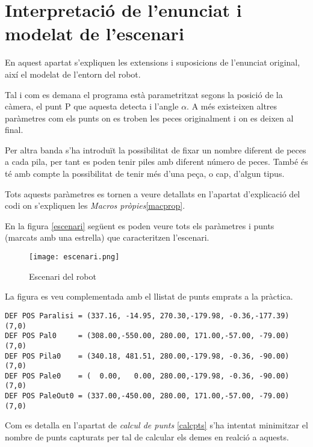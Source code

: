 \section{Interpretació de l'enunciat i modelat de l'escenari}
En aquest apartat s'expliquen les extensions i suposicions de l'enunciat original,
així el modelat de l'entorn del robot.

Tal i com es demana el programa està parametritzat segons la posició de la càmera,
el punt P que aquesta detecta i l'angle $\alpha$. A més existeixen altres paràmetres
com els punts on es troben les peces originalment i on es deixen al final.

Per altra banda s'ha introduït la possibilitat de fixar un nombre diferent de peces
a cada pila, per tant es poden tenir piles amb diferent número de peces. També
és té amb compte la possibilitat de tenir més d'una peça, o cap, d'algun tipus.

Tots aquests paràmetres es tornen a veure detallats en l'apartat d'explicació del
codi on s'expliquen les \emph{Macros pròpies}\ref{macprop}.

En la figura \ref{escenari} següent es poden veure tots els paràmetres i punts
(marcats amb una estrella) que caracteritzen l'escenari.

\begin{figure}[H]
\begin{center}\label{fig:escenari}
 \texttt{[image: escenari.png]}
\end{center}
  \caption{Escenari del robot}
\end{figure}

La figura es veu complementada amb el llistat de punts emprats a la pràctica.

\begin{verbatim}
DEF POS Paralisi = (337.16, -14.95, 270.30,-179.98, -0.36,-177.39)(7,0)
DEF POS Pal0     = (308.00,-550.00, 280.00, 171.00,-57.00, -79.00)(7,0)
DEF POS Pila0    = (340.18, 481.51, 280.00,-179.98, -0.36, -90.00)(7,0)
DEF POS Pale0    = (  0.00,   0.00, 280.00,-179.98, -0.36, -90.00)(7,0)
DEF POS PaleOut0 = (337.00,-450.00, 280.00, 171.00,-57.00, -79.00)(7,0)
\end{verbatim}

Com es detalla en l'apartat de \emph{calcul de punts} \ref{calcpts}
s'ha intentat minimitzar el nombre de punts capturats per tal
de calcular els demes en realció a aquests.

